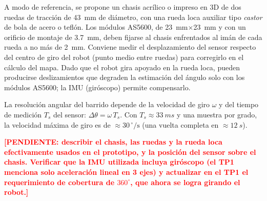 \documentclass[12pt,a4paper]{article}
\newcommand{\pendiente}[1]{\textcolor{red}{\textbf{[PENDIENTE: #1]}}}
\begin{document}
\begin{visar}
A modo de referencia, se propone un chasis acrílico o impreso en 3D de dos ruedas de tracción de \SI{43}{mm} de diámetro, con una rueda loca auxiliar tipo \emph{castor} de bola de acero o teflón. Los módulos AS5600, de \SI{23}{mm}$\times$\SI{23}{mm} y con un orificio de montaje de \SI{3,7}{mm}, deben fijarse al chasis enfrentados al imán de cada rueda a no más de \SI{2}{mm}. Conviene medir el desplazamiento del sensor respecto del centro de giro del robot (punto medio entre ruedas) para corregirlo en el cálculo del mapa. Dado que el robot gira apoyado en la rueda loca, pueden producirse deslizamientos que degraden la estimación del ángulo solo con los módulos AS5600; la IMU (giróscopo) permite compensarlo.

La resolución angular del barrido depende de la velocidad de giro $\omega$ y del tiempo de medición $T_s$ del sensor: $\Delta\theta = \omega\,T_s$. Con $T_s \approx \SI{33}{ms}$ y una muestra por grado, la velocidad máxima de giro es de $\approx 30\,^\circ/\mathrm{s}$ (una vuelta completa en $\approx\SI{12}{s}$).
\end{visar}
\pendiente{describir el chasis, las ruedas y la rueda loca efectivamente usados en el prototipo, y la posición del sensor sobre el chasis. Verificar que la IMU utilizada incluya giróscopo (el TP1 menciona solo aceleración lineal en 3 ejes) y actualizar en el TP1 el requerimiento de cobertura de $360^\circ$, que ahora se logra girando el robot.}

\end{document}
